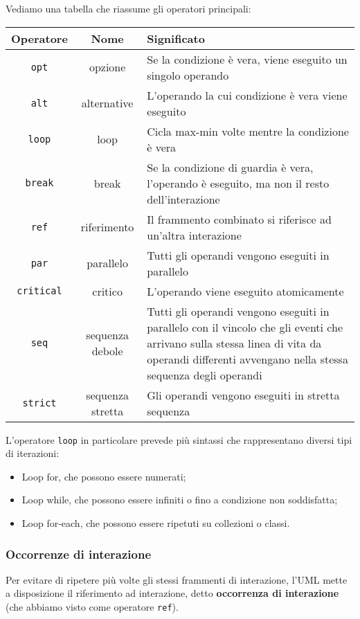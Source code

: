 \documentclass[a4paper,11pt]{article}
\begin{document}
Vediamo una tabella che riassume gli operatori principali:
\begin{table}[H]
	\center {}
	\begin{tabular} { c | c | p{9cm} }
		\bfseries Operatore & \bfseries Nome & \bfseries Significato \\
		\hline 
		\lstinline|opt| & opzione & Se la condizione è vera, viene eseguito un singolo operando \\ 
		\lstinline|alt| & alternative & L’operando la cui condizione è vera viene eseguito \\ 
		\lstinline|loop| & loop & Cicla max-min volte mentre la condizione è vera \\ 
		\lstinline|break| & break & Se la condizione di guardia è vera, l’operando è eseguito, ma non il resto dell’interazione \\ 
		\lstinline|ref| & riferimento & Il frammento combinato si riferisce ad un’altra interazione \\ 
		\lstinline|par| & parallelo & Tutti gli operandi vengono eseguiti in parallelo \\ 
		\lstinline|critical| & critico & L’operando viene eseguito atomicamente \\ 
		\lstinline|seq| & sequenza debole & Tutti gli operandi vengono eseguiti in parallelo con il vincolo che gli eventi che arrivano sulla stessa linea di vita da operandi differenti avvengano nella stessa sequenza degli operandi \\ 
		\lstinline|strict| & sequenza stretta & Gli operandi vengono eseguiti in stretta sequenza
	\end{tabular}
\end{table}

L'operatore \lstinline|loop| in particolare prevede più sintassi che rappresentano diversi tipi di iterazioni:
\begin{itemize}
	\item Loop for, che possono essere numerati;
	\item Loop while, che possono essere infiniti o fino a condizione non soddisfatta;
	\item Loop for-each, che possono essere ripetuti su collezioni o classi.
\end{itemize}

\subsubsection{Occorrenze di interazione}
Per evitare di ripetere più volte gli stessi frammenti di interazione, l'UML  mette a disposizione il riferimento ad interazione, detto \textbf{occorrenza di interazione} (che abbiamo visto come operatore \lstinline|ref|).
\end{document}

